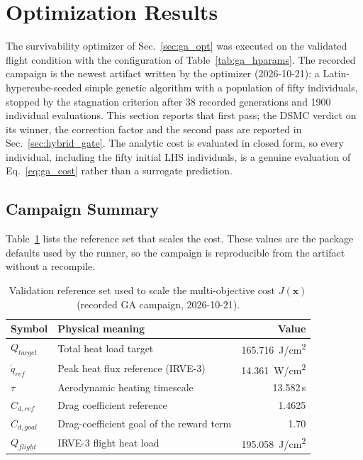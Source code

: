 \section{Optimization Results}
\label{sec:optimization_results}

The survivability optimizer of Sec.~\ref{sec:ga_opt} was executed on the validated flight condition with the configuration of Table~\ref{tab:ga_hparams}. The recorded campaign is the newest artifact written by the optimizer (2026-10-21): a Latin-hypercube-seeded simple genetic algorithm with a population of fifty individuals, stopped by the stagnation criterion after 38 recorded generations and 1900 individual evaluations. This section reports that first pass; the DSMC verdict on its winner, the correction factor and the second pass are reported in Sec.~\ref{sec:hybrid_gate}. The analytic cost is evaluated in closed form, so every individual, including the fifty initial LHS individuals, is a genuine evaluation of Eq.~\eqref{eq:ga_cost} rather than a surrogate prediction.

\subsection{Campaign Summary}
Table~\ref{tab:ga_reference} lists the reference set that scales the cost. These values are the package defaults used by the runner, so the campaign is reproducible from the artifact without a recompile.

\begin{table}[H]
    \centering
    \caption{Validation reference set used to scale the multi-objective cost $J(\mathbf{x})$ (recorded GA campaign, 2026-10-21).}
    \label{tab:ga_reference}
    \begin{tabular}{llr}
        \toprule
        \textbf{Symbol} & \textbf{Physical meaning} & \textbf{Value} \\
        \midrule
        $Q_{target}$ & Total heat load target & 165.716~J/cm\textsuperscript{2} \\
        $\dot{q}_{ref}$  & Peak heat flux reference (IRVE-3) & 14.361~W/cm\textsuperscript{2} \\
        $\tau$           & Aerodynamic heating timescale & 13.582\,s \\
        $C_{d,ref}$      & Drag coefficient reference & 1.4625 \\
        $C_{d,goal}$     & Drag-coefficient goal of the reward term & 1.70 \\
        $Q_{flight}$     & IRVE-3 flight heat load & 195.058~J/cm\textsuperscript{2} \\
        \bottomrule
    \end{tabular}
\end{table}

